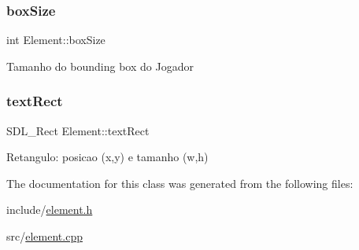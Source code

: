 \subsubsection{\texorpdfstring{box\+Size}{boxSize}}
{\footnotesize\ttfamily int Element\+::box\+Size\hspace{0.3cm}{\ttfamily [protected]}}

Tamanho do bounding box do Jogador \mbox{\label{classElement_a79d353f4c8bb44fe60390d02571cac64}} 
\subsubsection{\texorpdfstring{text\+Rect}{textRect}}
{\footnotesize\ttfamily S\+D\+L\+\_\+\+Rect Element\+::text\+Rect\hspace{0.3cm}{\ttfamily [protected]}}

Retangulo\+: posicao (x,y) e tamanho (w,h) 

The documentation for this class was generated from the following files\+:\begin{DoxyCompactItemize}
\item 
include/\hyperlink{element_8h}{element.\+h}\item 
src/\hyperlink{element_8cpp}{element.\+cpp}\end{DoxyCompactItemize}
